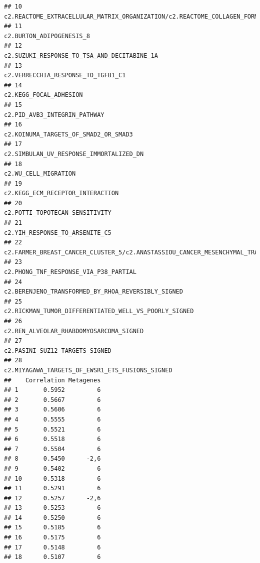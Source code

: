 \documentclass{article}\usepackage[]{graphicx}\usepackage[]{color}
\makeatletter
\newenvironment{kframe}{%
 \def\at@end@of@kframe{}%
 \ifinner\ifhmode%
  \def\at@end@of@kframe{\end{minipage}}%
  \begin{minipage}{\columnwidth}%
 \fi\fi%
 \def\FrameCommand##1{\hskip\@totalleftmargin \hskip-\fboxsep
 \colorbox{shadecolor}{##1}\hskip-\fboxsep
     \hskip-\linewidth \hskip-\@totalleftmargin \hskip\columnwidth}%
 \MakeFramed {\advance\hsize-\width
   \@totalleftmargin\z@ \linewidth\hsize
   \@setminipage}}%
 {\par\unskip\endMakeFramed%
 \at@end@of@kframe}
\newenvironment{knitrout}{}{} %
\makeatother
\begin{document}
\begin{knitrout}
\begin{kframe}
\begin{verbatim}
## 10                           c2.REACTOME_EXTRACELLULAR_MATRIX_ORGANIZATION/c2.REACTOME_COLLAGEN_FORMATION
## 11                                                                               c2.BURTON_ADIPOGENESIS_8
## 12                                                            c2.SUZUKI_RESPONSE_TO_TSA_AND_DECITABINE_1A
## 13                                                                     c2.VERRECCHIA_RESPONSE_TO_TGFB1_C1
## 14                                                                                 c2.KEGG_FOCAL_ADHESION
## 15                                                                           c2.PID_AVB3_INTEGRIN_PATHWAY
## 16                                                                   c2.KOINUMA_TARGETS_OF_SMAD2_OR_SMAD3
## 17                                                                c2.SIMBULAN_UV_RESPONSE_IMMORTALIZED_DN
## 18                                                                                   c2.WU_CELL_MIGRATION
## 19                                                                       c2.KEGG_ECM_RECEPTOR_INTERACTION
## 20                                                                         c2.POTTI_TOPOTECAN_SENSITIVITY
## 21                                                                         c2.YIH_RESPONSE_TO_ARSENITE_C5
## 22 c2.FARMER_BREAST_CANCER_CLUSTER_5/c2.ANASTASSIOU_CANCER_MESENCHYMAL_TRANSITION_SIGNATURE/c4.GNF2_CDH11
## 23                                                                  c2.PHONG_TNF_RESPONSE_VIA_P38_PARTIAL
## 24                                                     c2.BERENJENO_TRANSFORMED_BY_RHOA_REVERSIBLY_SIGNED
## 25                                                  c2.RICKMAN_TUMOR_DIFFERENTIATED_WELL_VS_POORLY_SIGNED
## 26                                                                c2.REN_ALVEOLAR_RHABDOMYOSARCOMA_SIGNED
## 27                                                                         c2.PASINI_SUZ12_TARGETS_SIGNED
## 28                                                        c2.MIYAGAWA_TARGETS_OF_EWSR1_ETS_FUSIONS_SIGNED
##    Correlation Metagenes
## 1       0.5952         6
## 2       0.5667         6
## 3       0.5606         6
## 4       0.5555         6
## 5       0.5521         6
## 6       0.5518         6
## 7       0.5504         6
## 8       0.5450      -2,6
## 9       0.5402         6
## 10      0.5318         6
## 11      0.5291         6
## 12      0.5257      -2,6
## 13      0.5253         6
## 14      0.5250         6
## 15      0.5185         6
## 16      0.5175         6
## 17      0.5148         6
## 18      0.5107         6

\end{verbatim}
\end{kframe}
\end{knitrout}
\end{document}

